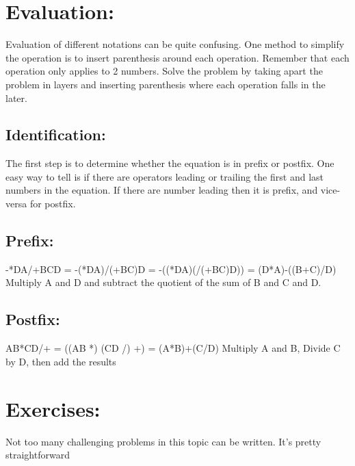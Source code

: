 \documentclass[10pt]{article}
\begin{document}
\section{Evaluation:}
Evaluation of different notations can be quite confusing. One method to simplify the operation is to insert parenthesis around each operation. Remember that each operation only applies to 2 numbers. Solve the problem by taking apart the problem in layers and inserting parenthesis where each operation falls in the later.

\subsection{Identification:}
The first step is to determine whether the equation is in prefix or postfix. One easy way to tell is if there are operators leading or trailing the first and last numbers in the equation. If there are number leading then it is prefix, and vice-versa for postfix.

\subsection{Prefix:}
-*DA/+BCD = -(*DA)/(+BC)D = -((*DA)(/(+BC)D)) = (D*A)-((B+C)/D) Multiply A and D and subtract the quotient of the sum of B and C and D.

\subsection{Postfix:}
AB*CD/+ = ((AB *) (CD /) +) = (A*B)+(C/D)
Multiply A and B, Divide C by D, then add the results

\section{Exercises:}
Not too many challenging problems in this topic can be written. It's pretty straightforward
\end{document}
